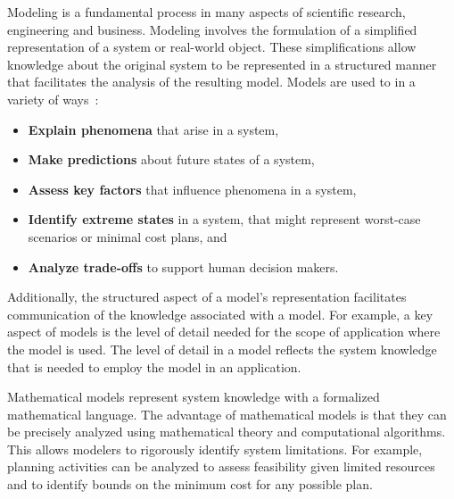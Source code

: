 Modeling is a fundamental process in many aspects of scientific
research, engineering and business.  Modeling involves the formulation
of a simplified representation of a system or real-world object.
These simplifications allow knowledge about the original system to be
represented in a structured manner that facilitates the analysis of the
resulting model.  Models are used to in a variety of ways~\cite{Sch04}:
\begin{itemize}

\item {\bf Explain phenomena} that arise in a system,

\item {\bf Make predictions} about future states of a system,

\item {\bf Assess key factors} that influence phenomena in a system,

\item {\bf Identify extreme states} in a system, that might represent worst-case scenarios or
 minimal cost plans, and

\item {\bf Analyze trade-offs} to support human decision makers.

\end{itemize}
Additionally, the structured aspect of a model's representation
facilitates communication of the knowledge associated with a model.
For example, a key aspect of models is the level of detail needed for
the scope of application where the model is used.  The level of detail
in a model reflects the system knowledge that is needed to employ the
model in an application.

Mathematical models represent system knowledge with a formalized
mathematical language.  The advantage of mathematical models is
that they can be precisely analyzed using mathematical theory and
computational algorithms.  This allows modelers to rigorously identify
system limitations.  For example, planning activities can be analyzed
to assess feasibility given limited resources and to identify bounds on
the minimum cost for any possible plan.

